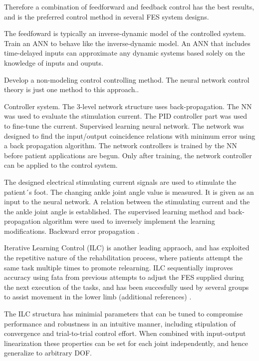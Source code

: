 Therefore a combination of feedforward and feedback control has the best results, and is the preferred control method in several FES system designs. 

The feedfoward is typically an inverse-dynamic model of the controlled system. Train an ANN to behave like the inverse-dynamic model. An ANN that includes time-delayed inputs can approximate any dynamic systems based solely on the knowledge of inputs and ouputs.

Develop a non-modeling control controlling method. The neural network control theory is just one method to this approach.\cite{NNPID}.

Controller system. The 3-level network structure uses back-propagation. The NN was used to evaluate the stimulation current. The PID controller part was used to fine-tune the current. Supervised learning neural network. The network was designed to find the input/output coincidence relations with minimum error using a back propagation algorithm. The network controllers is trained by the NN before patient applications are begun. Only after training, the network controller can be applied to the control system. \cite{NNPID}

The designed electrical stimulating current signals are used to stimulate the patient´s foot. The changing ankle joint angle value is measured. It is given as an input to the neural network. A relation between the stimulating current and the the ankle joint angle is established. The supervised learning method and back-propagation algorithm were used to inversely implement the learning modifications. Backward error propagation \cite{NNPID}.

Iterative Learning Control (ILC) is another leading appraoch, and has exploited the repetitive nature of the rehabilitation process, where patients attempt the same task multiple times to promote relearning. ILC sequentially improves accuracy using fata from previous attempts to adjust the FES supplied during the next execution of the tasks, and has been succesfully used by several groups to assist movement in the lower limb (additional references) \cite{IOL}.

The ILC structura has minimial parameters that can be tuned to compromise performance and robustness in an intuitive manner, including stipulation of convergence and trial-to-trial control effort. When combined with input-output linearization these properties can be set for each joint independently, and hence generalize to arbitrary DOF. \cite{IOL}

